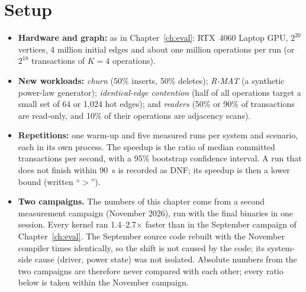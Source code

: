 \documentclass[11pt,a4paper,oneside]{report}
\begin{document}
\section{Setup}
\label{sec:extsetup}
\begin{itemize}
\item \textbf{Hardware and graph:} as in Chapter~\ref{ch:eval}: RTX~4060 Laptop GPU, $2^{20}$ vertices, 4 million
  initial edges and about one million operations per run (or $2^{18}$ transactions of $K=4$ operations).
\item \textbf{New workloads:} \emph{churn} (50\% inserts, 50\% deletes); \emph{R-MAT} (a synthetic power-law
  generator); \emph{identical-edge contention} (half of all operations target a small set of 64 or 1,024 hot edges);
  and \emph{readers} (50\% or 90\% of transactions are read-only, and 10\% of their operations are adjacency scans).
\item \textbf{Repetitions:} one warm-up and five measured runs per system and scenario, each in its own process. The
  speedup is the ratio of median committed transactions per second, with a 95\% bootstrap confidence interval. A run
  that does not finish within 90~s is recorded as DNF; its speedup is then a lower bound (written ``$>$'').
\item \textbf{Two campaigns.} The numbers of this chapter come from a second measurement campaign (November 2026),
  run with the final binaries in one session. Every kernel ran 1.4--2.7$\times$ faster than in the September
  campaign of Chapter~\ref{ch:eval}. The September source code rebuilt with the November compiler times identically,
  so the shift is not caused by the code; its system-side cause (driver, power state) was not isolated. Absolute
  numbers from the two campaigns are therefore never compared with each other; every ratio below is taken within the
  November campaign.
\end{itemize}
\end{document}
